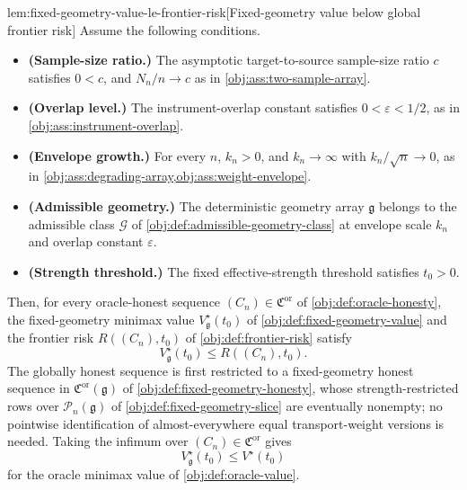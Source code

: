 \documentclass[11pt]{article}
\begin{document}
\begin{lemmav}{lem:fixed-geometry-value-le-frontier-risk}[Fixed-geometry value below global frontier risk]
Assume the following conditions.
\begin{itemize}
\item \textbf{(Sample-size ratio.)} The asymptotic target-to-source sample-size ratio \(c\) satisfies \(0<c\), and \(N_n/n\to c\) as in \cref{obj:ass:two-sample-array}.
\item \textbf{(Overlap level.)} The instrument-overlap constant satisfies \(0<\varepsilon<1/2\), as in \cref{obj:ass:instrument-overlap}.
\item \textbf{(Envelope growth.)} For every \(n\), \(k_n>0\), and \(k_n\to\infty\) with \(k_n/\sqrt n\to0\), as in \cref{obj:ass:degrading-array,obj:ass:weight-envelope}.
\item \textbf{(Admissible geometry.)} The deterministic geometry array \(\mathfrak g\) belongs to the admissible class \(\mathcal G\) of \cref{obj:def:admissible-geometry-class} at envelope scale \(k_n\) and overlap constant \(\varepsilon\).
\item \textbf{(Strength threshold.)} The fixed effective-strength threshold satisfies \(t_0>0\).
\end{itemize}
Then, for every oracle-honest sequence \((C_n)\in\mathfrak C^{\mathrm{or}}\) of \cref{obj:def:oracle-honesty}, the fixed-geometry minimax value \(V_{\mathfrak g}^\star(t_0)\) of \cref{obj:def:fixed-geometry-value} and the frontier risk \(R((C_n),t_0)\) of \cref{obj:def:frontier-risk} satisfy
\[
V_{\mathfrak g}^\star(t_0)\le R((C_n),t_0).
\]
The globally honest sequence is first restricted to a fixed-geometry honest sequence in \(\mathfrak C^{\mathrm{or}}(\mathfrak g)\) of \cref{obj:def:fixed-geometry-honesty}, whose strength-restricted rows over \(\mathcal P_n(\mathfrak g)\) of \cref{obj:def:fixed-geometry-slice} are eventually nonempty; no pointwise identification of almost-everywhere equal transport-weight versions is needed. Taking the infimum over \((C_n)\in\mathfrak C^{\mathrm{or}}\) gives
\[
V_{\mathfrak g}^\star(t_0)\le V^\star(t_0)
\]
for the oracle minimax value of \cref{obj:def:oracle-value}.
\end{lemmav}
\end{document}
